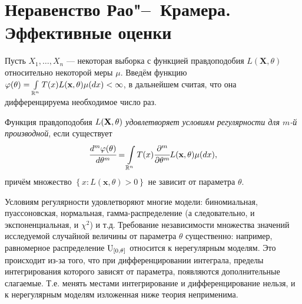 \section{Неравенство Рао"--~Крамера. Эффективные оценки}
Пусть $X_1, \ldots, X_n$  —  некоторая выборка с функцией правдоподобия $L(\mathbf{X}, \theta)$ относительно некоторой меры $\mu$. Введём функцию ${\varphi(\theta)=\int\limits_{\mathbb{R}^{n}} T(x) L(\mathbf{x}, \theta) \mu(d x)<\infty}$, в дальнейшем считая, что она дифференцируема необходимое число раз.

\begin{defn}
    Функция правдоподобия $L(\mathbf{X}, \theta)$ \textit{удовлетворяет условиям регулярности для $m$-й производной}, если существует
    \begin{equation*}
        \cfrac{d^{m} \varphi(\theta)}{d \theta^{m}}=\int\limits_{\mathbb{R}^{n}} T(x) \cfrac{\partial^{m}}{\partial \theta^{m}}L(\mathbf{x}, \theta) \mu(d x),
    \end{equation*}
    причём множество $\left\{ {x\colon L(\mathbf{x},\theta) > 0} \right\}$ не зависит от параметра $\theta$.
\end{defn}

\begin{exmp}
    Условиям регулярности удовлетворяют многие модели: биномиальная, пуассоновская, нормальная, гамма-распределение (а следовательно, и экспоненциальная, и $\chi^2$) и т.д.
    Требование независимости множества значений исследуемой случайной величины от параметра $\theta$ существенно: например, равномерное распределение $\operatorname{\mathrm{U}}_{[0, \theta]}$ относится к нерегулярным моделям.
    Это происходит из-за того, что при дифференцировании интеграла, пределы интегрирования которого зависят от параметра, появляются дополнительные слагаемые. 
    Т.е. менять местами интегрирование и дифференцирование нельзя, и к нерегулярным моделям изложенная ниже теория неприменима.
\end{exmp}

